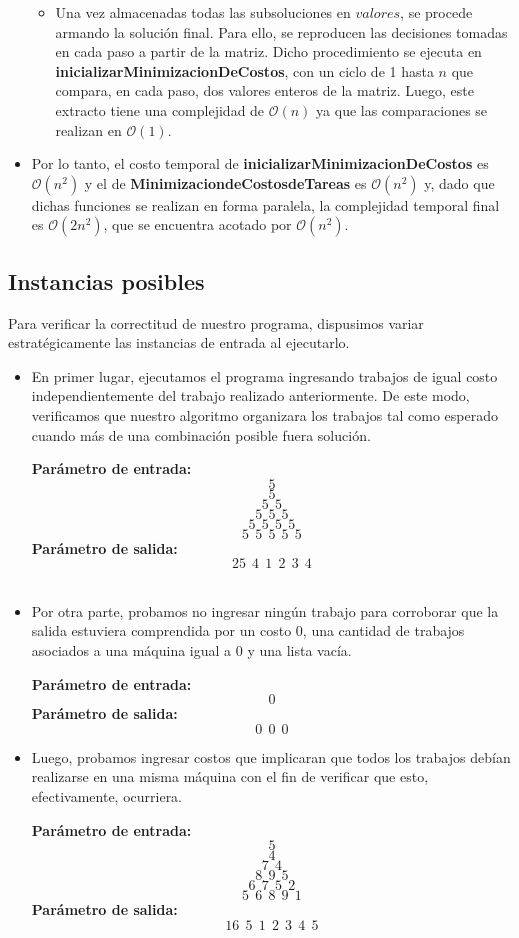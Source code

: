 \begin{itemize}
\begin{itemize}
\item Una vez almacenadas todas las subsoluciones en $valores$, se procede armando la solución final. Para ello, se reproducen las decisiones tomadas en cada paso a partir de la matriz. Dicho procedimiento se ejecuta en \textbf{inicializarMinimizacionDeCostos}, con un ciclo de 1 hasta $n$ que compara, en cada paso, dos valores enteros de la matriz. Luego, este extracto tiene una complejidad de $\mathcal{O}(n)$ ya que las comparaciones se realizan en $\mathcal{O}(1)$.

\end{itemize}
\item Por lo tanto, el costo temporal de \textbf{inicializarMinimizacionDeCostos} es $\mathcal{O}(n^{2})$ y el de \textbf{MinimizaciondeCostosdeTareas} es $\mathcal{O}(n^{2})$ y, dado que dichas funciones se realizan en forma paralela, la complejidad temporal final es $\mathcal{O}(2n^{2})$, que se encuentra acotado por $\mathcal{O}(n^{2})$. 
\end{itemize}

\subsection{Instancias posibles}
Para verificar la correctitud de nuestro programa, dispusimos variar estratégicamente las instancias de entrada al ejecutarlo.
\begin{itemize}
\item En primer lugar, ejecutamos el programa ingresando trabajos de igual costo independientemente del trabajo realizado anteriormente. De este modo, verificamos que nuestro algoritmo organizara los trabajos tal como esperado cuando más de una combinación posible fuera solución.\newline

\textbf{Parámetro de entrada:} $$5$$
$$5$$
$$5\ \ 5$$
$$5\ \ 5\ \ 5$$
$$5\ \ 5\ \ 5\ \ 5$$
$$5\ \ 5\ \ 5\ \ 5\ \ 5$$
\textbf{Parámetro de salida:} $$25\ \ 4\ \ 1\ \ 2\ \ 3\ \ 4$$\\
\item Por otra parte, probamos no ingresar ningún trabajo para corroborar que la salida estuviera comprendida por un costo 0, una cantidad de trabajos asociados a una máquina igual a 0 y una lista vacía.\newline

\textbf{Parámetro de entrada:} $$0$$
\textbf{Parámetro de salida:} $$0\ \ 0 \ \ 0$$

\item Luego, probamos ingresar costos que implicaran que todos los trabajos debían realizarse en una misma máquina con el fin de verificar que esto, efectivamente, ocurriera.\newline

\textbf{Parámetro de entrada:} $$5$$
$$4$$
$$7\ \ 4$$
$$8\ \ 9\ \ 5$$
$$6\ \ 7\ \ 5\ \ 2$$
$$5\ \ 6\ \ 8\ \ 9\ \ 1$$
\textbf{Parámetro de salida:} $$16\ \ 5 \ \ 1\ \ 2\ \ 3\ \ 4\ \ 5$$
\end{itemize}

